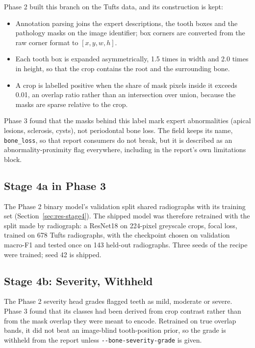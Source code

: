 Phase 2 built this branch on the Tufts data, and its construction is kept:
\begin{itemize}
\item Annotation parsing joins the expert descriptions, the tooth boxes and the pathology masks on
  the image identifier; box corners are converted from the raw corner format to $[x, y, w, h]$.
\item Each tooth box is expanded asymmetrically, 1.5 times in width and 2.0 times in height, so that
  the crop contains the root and the surrounding bone.
\item A crop is labelled positive when the share of mask pixels inside it exceeds 0.01, an overlap
  ratio rather than an intersection over union, because the masks are sparse relative to the crop.
\end{itemize}

Phase 3 found that the masks behind this label mark expert abnormalities (apical lesions, sclerosis,
cysts), not periodontal bone loss. The field keeps its name, \texttt{bone\_loss}, so that report
consumers do not break, but it is described as an abnormality-proximity flag everywhere, including in
the report's own limitations block.

\subsection{Stage 4a in Phase 3}

The Phase 2 binary model's validation split shared radiographs with its training set
(Section~\ref{sec:res-stage4}). The shipped model was therefore retrained with the split made by
radiograph: a ResNet18 on 224-pixel greyscale crops, focal loss, trained on 678 Tufts radiographs, with
the checkpoint chosen on validation macro-F1 and tested once on 143 held-out radiographs. Three seeds
of the recipe were trained; seed 42 is shipped.

\subsection{Stage 4b: Severity, Withheld}

The Phase 2 severity head grades flagged teeth as mild, moderate or severe. Phase 3 found that its
classes had been derived from crop contrast rather than from the mask overlap they were meant to
encode. Retrained on true overlap bands, it did not beat an image-blind tooth-position prior, so the
grade is withheld from the report unless \texttt{-{}-bone-severity-grade} is given.

